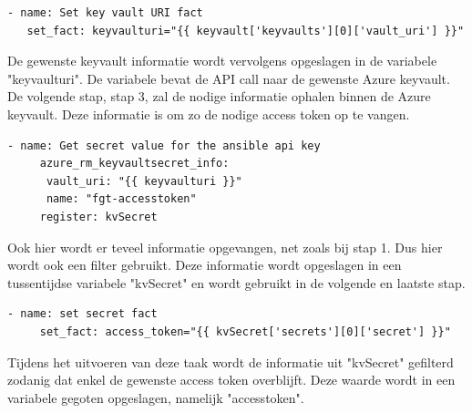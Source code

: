 \begin{lstlisting}[caption={Playbook keyvault.yml, task get API call}]
 - name: Set key vault URI fact
   set_fact: keyvaulturi="{{ keyvault['keyvaults'][0]['vault_uri'] }}"
\end{lstlisting}

De gewenste keyvault informatie wordt vervolgens opgeslagen in de variabele "keyvaulturi". De variabele bevat de API call naar de gewenste Azure keyvault. De volgende stap, stap 3, zal de nodige informatie ophalen binnen de Azure keyvault. Deze informatie is om zo de nodige access token op te vangen.

\begin{lstlisting}[caption={Playbook keyvault.yml, task get info secret}]
   - name: Get secret value for the ansible api key
     azure_rm_keyvaultsecret_info:
      vault_uri: "{{ keyvaulturi }}"
      name: "fgt-accesstoken"
     register: kvSecret
\end{lstlisting}

Ook hier wordt er teveel informatie opgevangen, net zoals bij stap 1. Dus hier wordt ook een filter gebruikt. Deze informatie wordt opgeslagen in een tussentijdse variabele "kvSecret" en wordt gebruikt in de volgende en laatste stap. 

\begin{lstlisting}[caption={Playbook keyvault.yml, task get access token}]
   - name: set secret fact
     set_fact: access_token="{{ kvSecret['secrets'][0]['secret'] }}"
\end{lstlisting}

Tijdens het uitvoeren van deze taak wordt de informatie uit "kvSecret" gefilterd zodanig dat enkel de gewenste access token overblijft. Deze waarde wordt in een variabele gegoten opgeslagen, namelijk "access\textunderscore token". 



